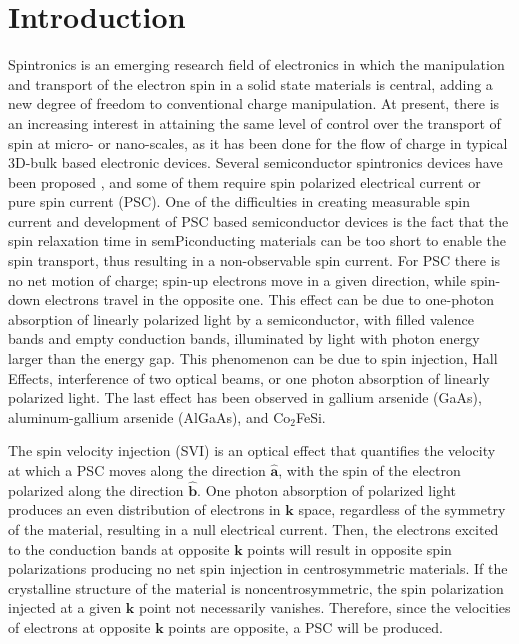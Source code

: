 \documentclass[floatfix,prb,aps,superscriptaddress,showpacs,11pt,preprint,letterpaper]{revtex4}
\begin{document}
\section{Introduction}
\label{sec:introduction}

Spintronics is an emerging research field of electronics in which the
manipulation and transport of the electron spin in a solid state materials  is
central, adding a new degree of freedom to conventional charge
manipulation.\cite{wolfSC04,fabianAPS07} At present, there is an increasing
interest in attaining the same level of control over the transport of spin at
micro- or nano-scales, as it has been done for the flow of charge in typical
3D-bulk based electronic devices.\cite{awschalomNP2007} Several semiconductor
spintronics devices have been proposed \cite{majumdarAPL06,
dattaAPL90,gotteNat16,pershinPRB08}, and some of them require spin polarized
electrical current \cite{awschalomSSBM13} or pure spin current (PSC). One of
the difficulties in creating measurable  spin current and
development of PSC based semiconductor devices is the fact that the spin
relaxation time in semPiconducting materials can be too short to enable the
spin transport, thus resulting in a non-observable spin
current.\cite{murakamiSc03} For PSC there is no net motion of charge; spin-up
electrons move in a given direction, while spin-down electrons travel in the
opposite one. This effect can be due to one-photon absorption of linearly
polarized light by a semiconductor, with filled valence bands and empty
conduction bands, illuminated by light with photon energy larger than the
energy gap. This phenomenon can be due to spin injection,\cite{malPRB03} Hall
Effects,\cite{sinovaPRB04} interference of two optical beams,\cite{bhatPRL00,
najmaiePRB03} or one photon absorption of linearly polarized
light\cite{bhatPRL05}. The last effect has been observed in gallium arsenide
(GaAs),\cite{zhaoPRL2006, stevensPRL03} aluminum-gallium arsenide
(AlGaAs),\cite{stevensPRL03} and Co$_2$FeSi.\cite{kimuraNGPAM12}

The spin velocity injection (SVI) is an optical effect that quantifies the
velocity at which a PSC moves along the direction $\hat{\mathbf{a}}$, with the
spin of the electron polarized along the direction $\hat{\mathbf{b}}$. One
photon absorption of polarized light produces an even distribution of electrons
in $\mathbf{k}$ space, regardless of the symmetry of the material, resulting in
a null electrical current.\cite{bhatPRL05} Then, the electrons excited to the
conduction bands at opposite $\mathbf{k}$ points will result in opposite spin
polarizations producing no net spin injection in centrosymmetric
materials.\cite{bhatPRL05} If the crystalline structure of the material is
noncentrosymmetric, the spin polarization injected at a given $\mathbf{k}$
point not necessarily vanishes.\cite{alvaradoPRL85,schmiedeskampPRL88}
Therefore, since the velocities of electrons at opposite $\mathbf{k}$ points
are opposite, a PSC will be produced.
\end{document}
